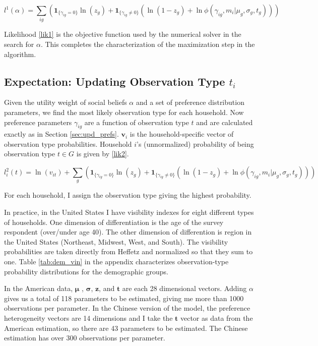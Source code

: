 \begin{equation}
	\label{lik1}
    l^1(\alpha) = \sum_{ig} \left(\mathbf{1}_{\{\gamma_{ig} = 0\}}\ln\left(z_g\right) + \mathbf{1}_{\{\gamma_{ig} \neq 0\}} \left(\ln\left(1 - z_g\right)+\ln \phi(\gamma_{ig},m_i|\mu_g,\sigma_g,t_g)\right)\right)
\end{equation}

Likelihood \eqref{lik1} is the objective function used by the numerical solver in the search for $\alpha$.  This completes the characterization of the maximization step in the algorithm.

\subsection{Expectation: Updating Observation Type $t_i$} 

Given the utility weight of social beliefs $\alpha$ and a set of preference distribution parameters, we find the most likely observation type for each household. Now preference parameters $\gamma_{ig}$ are a function of observation type $t$ and are calculated exactly as in Section \ref{sec:upd_prefs}. $\mathbf{v}_i$ is the household-specific vector of observation type probabilities.  Household $i$'s (unnormalized) probability of being observation type $t \in G$ is given by \eqref{lik2}.

\begin{equation}
    \label{lik2}
    l_i^2(t) = \ln(v_{it}) + \sum_{g} \left(\mathbf{1}_{\{\gamma_{ig} = 0\}}\ln\left(z_g\right) + \mathbf{1}_{\{\gamma_{ig} \neq 0\}} \left(\ln\left(1-z_g\right)+\ln \phi(\gamma_{ig}, m_i|\mu_g,\sigma_g,t_g)\right)\right)
\end{equation}

For each household, I assign the observation type giving the highest probability.

In practice, in the United States I have visibility indexes for eight different types of households.  One dimension of differentiation is the age of the survey respondent (over/under age 40). The other dimension of differention is region in the United States (Northeast, Midwest, West, and South).  The visibility probabilities are taken directly from Heffetz and normalized so that they sum to one.  Table \ref{tab:dem_vin} in the appendix characterizes observation-type probability distributions for the demographic groups.


In the American data, $\boldsymbol{\mu}$ , $\boldsymbol{\sigma}$, $\mathbf{z}$, and $\mathbf{t}$ are each 28 dimensional vectors. Adding $\alpha$ gives us a total of 118 parameters to be estimated, giving me more than 1000 observations per parameter.  In the Chinese version of the model, the preference heterogeneity vectors are 14 dimensions and I take the $\mathbf{t}$ vector as data from the American estimation, so there are 43 parameters to be estimated.  The Chinese estimation has over 300 observations per parameter.

